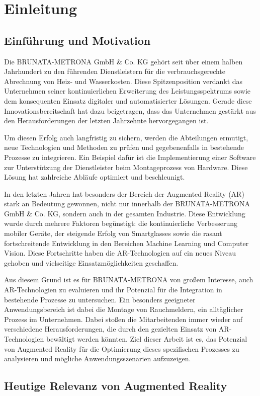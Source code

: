 \chapter{Einleitung}

\section{Einführung und Motivation}

Die BRUNATA-METRONA GmbH & Co. KG gehört seit über einem halben Jahrhundert zu den führenden Dienstleistern für die verbrauchsgerechte Abrechnung von Heiz- und Wasserkosten. Diese Spitzenposition verdankt das Unternehmen seiner kontinuierlichen Erweiterung des Leistungsspektrums sowie dem konsequenten Einsatz digitaler und automatisierter Lösungen. Gerade diese Innovationsbereitschaft hat dazu beigetragen, dass das Unternehmen gestärkt aus den Herausforderungen der letzten Jahrzehnte hervorgegangen ist.

Um diesen Erfolg auch langfristig zu sichern, werden die Abteilungen ermutigt, neue Technologien und Methoden zu prüfen und gegebenenfalls in bestehende Prozesse zu integrieren. Ein Beispiel dafür ist die Implementierung einer Software zur Unterstützung der Dienstleister beim Montageprozess von Hardware. Diese Lösung hat zahlreiche Abläufe optimiert und beschleunigt.

In den letzten Jahren hat besonders der Bereich der Augmented Reality (AR) stark an Bedeutung gewonnen, nicht nur innerhalb der BRUNATA-METRONA GmbH & Co. KG, sondern auch in der gesamten Industrie. Diese Entwicklung wurde durch mehrere Faktoren begünstigt: die kontinuierliche Verbesserung mobiler Geräte, der steigende Erfolg von Smartglasses sowie die rasant fortschreitende Entwicklung in den Bereichen Machine Learning und Computer Vision. Diese Fortschritte haben die AR-Technologien auf ein neues Niveau gehoben und vielseitige Einsatzmöglichkeiten geschaffen.

Aus diesem Grund ist es für BRUNATA-METRONA von großem Interesse, auch AR-Technologien zu evaluieren und ihr Potenzial für die Integration in bestehende Prozesse zu untersuchen. Ein besonders geeigneter Anwendungsbereich ist dabei die Montage von Rauchmeldern, ein alltäglicher Prozess im Unternehmen. Dabei stoßen die Mitarbeitenden immer wieder auf verschiedene Herausforderungen, die durch den gezielten Einsatz von AR-Technologien bewältigt werden könnten. Ziel dieser Arbeit ist es, das Potenzial von Augmented Reality für die Optimierung dieses spezifischen Prozesses zu analysieren und mögliche Anwendungsszenarien aufzuzeigen.

\section{Heutige Relevanz von Augmented Reality}



